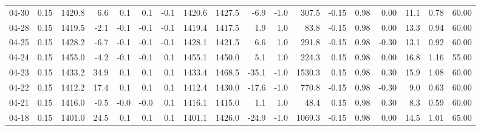 \begin{threeparttable}
{\begin{tabular}{lrrrrrrrrrrrrrrrrr}
  04-30 &     0.15 & 1420.8 &               6.6 &               0.1 &                0.1 &               -0.1 & 1420.6 & 1427.5 &       -6.9 &                     -1.0 &               307.5 &      -0.15 &      0.98 &           0.00 &             11.1 &            0.78 &                  60.00 \\
  04-28 &     0.15 & 1419.5 &              -2.1 &              -0.1 &               -0.1 &               -0.1 & 1419.4 & 1417.5 &        1.9 &                      1.0 &                83.8 &      -0.15 &      0.98 &           0.00 &             13.3 &            0.94 &                  60.00 \\
  04-25 &     0.15 & 1428.2 &              -6.7 &              -0.1 &               -0.1 &               -0.1 & 1428.1 & 1421.5 &        6.6 &                      1.0 &               291.8 &      -0.15 &      0.98 &          -0.30 &             13.1 &            0.92 &                  60.00 \\
  04-24 &     0.15 & 1455.0 &              -4.2 &              -0.1 &               -0.1 &                0.1 & 1455.1 & 1450.0 &        5.1 &                      1.0 &               224.3 &       0.15 &      0.98 &           0.00 &             16.8 &            1.16 &                  55.00 \\
  04-23 &     0.15 & 1433.2 &              34.9 &               0.1 &                0.1 &                0.1 & 1433.4 & 1468.5 &      -35.1 &                     -1.0 &              1530.3 &       0.15 &      0.98 &           0.30 &             15.9 &            1.08 &                  60.00 \\
  04-22 &     0.15 & 1412.2 &              17.4 &               0.1 &                0.1 &                0.1 & 1412.4 & 1430.0 &      -17.6 &                     -1.0 &               770.8 &      -0.15 &      0.98 &          -0.30 &              9.0 &            0.63 &                  60.00 \\
  04-21 &     0.15 & 1416.0 &              -0.5 &              -0.0 &               -0.0 &                0.1 & 1416.1 & 1415.0 &        1.1 &                      1.0 &                48.4 &       0.15 &      0.98 &           0.30 &              8.3 &            0.59 &                  60.00 \\
  04-18 &     0.15 & 1401.0 &              24.5 &               0.1 &                0.1 &                0.1 & 1401.1 & 1426.0 &      -24.9 &                     -1.0 &              1069.3 &      -0.15 &      0.98 &           0.00 &             14.5 &            1.01 &                  65.00 \\

\end{tabular}}
\end{threeparttable}
